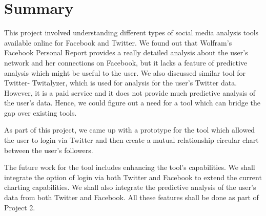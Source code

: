 \documentclass[12pt]{ucthesis}
\begin{document}
\chapter{Summary}
\label{Summary}
This project involved understanding different types of social media analysis tools available online for Facebook and Twitter. We found out that Wolfram's Facebook Personal Report provides a really detailed analysis about the user's network and her connections on Facebook, but it lacks a feature of predictive analysis which might be useful to the user. We also discussed similar tool for Twitter- Twitalyzer, which is used for analysis for the user's Twitter data. However, it is a paid service and it does not provide much predictive analysis of the user's data. Hence, we could figure out a need for a tool which can bridge the gap over existing tools.

As part of this project, we came up with a prototype for the tool which allowed the user to login via Twitter and then create a mutual relationship circular chart between the user's followers. 

The future work for the tool includes enhancing the tool's capabilities. We shall integrate the option of login via both Twitter and Facebook to extend the current charting capabilities. We shall also integrate the predictive analysis of the user's data from both Twitter and Facebook. All these features shall be done as part of Project 2.

\clearpage


\end{document}
